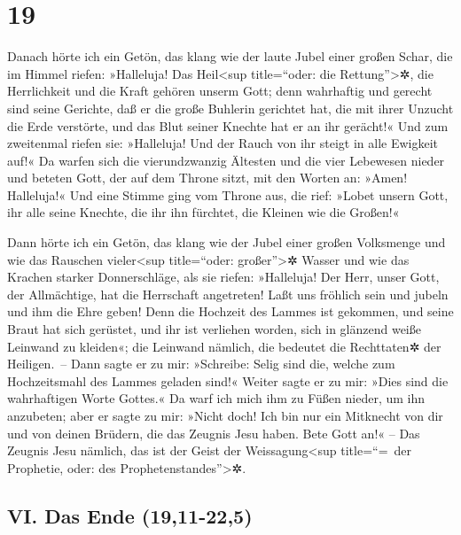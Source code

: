 \hypertarget{section-18}{%
\section{19}\label{section-18}}

 Danach hörte ich ein Getön, das klang wie der laute Jubel
einer großen Schar, die im Himmel riefen: »Halleluja! Das
Heil\textless sup title=``oder: die Rettung''\textgreater✲, die
Herrlichkeit und die Kraft gehören unserm Gott;  denn
wahrhaftig und gerecht sind seine Gerichte, daß er die große Buhlerin
gerichtet hat, die mit ihrer Unzucht die Erde verstörte, und das Blut
seiner Knechte hat er an ihr gerächt!«  Und zum zweitenmal
riefen sie: »Halleluja! Und der Rauch von ihr steigt in alle Ewigkeit
auf!«  Da warfen sich die vierundzwanzig Ältesten und die
vier Lebewesen nieder und beteten Gott, der auf dem Throne sitzt, mit
den Worten an: »Amen! Halleluja!«  Und eine Stimme ging
vom Throne aus, die rief: »Lobet unsern Gott, ihr alle seine Knechte,
die ihr ihn fürchtet, die Kleinen wie die Großen!«

 Dann hörte ich ein Getön, das klang wie der Jubel einer
großen Volksmenge und wie das Rauschen vieler\textless sup title=``oder:
großer''\textgreater✲ Wasser und wie das Krachen starker Donnerschläge,
als sie riefen: »Halleluja! Der Herr, unser Gott, der Allmächtige, hat
die Herrschaft angetreten!  Laßt uns fröhlich sein und
jubeln und ihm die Ehre geben! Denn die Hochzeit des Lammes ist
gekommen, und seine Braut hat sich gerüstet,  und ihr ist
verliehen worden, sich in glänzend weiße Leinwand zu kleiden«; die
Leinwand nämlich, die bedeutet die Rechttaten✲ der Heiligen.~--
 Dann sagte er zu mir: »Schreibe: Selig sind die, welche
zum Hochzeitsmahl des Lammes geladen sind!« Weiter sagte er zu mir:
»Dies sind die wahrhaftigen Worte Gottes.«  Da warf ich
mich ihm zu Füßen nieder, um ihn anzubeten; aber er sagte zu mir: »Nicht
doch! Ich bin nur ein Mitknecht von dir und von deinen Brüdern, die das
Zeugnis Jesu haben. Bete Gott an!« -- Das Zeugnis Jesu nämlich, das ist
der Geist der Weissagung\textless sup title=``=~der Prophetie, oder: des
Prophetenstandes''\textgreater✲.

\hypertarget{vi.-das-ende-1911-225}{%
\subsection{VI. Das Ende (19,11-22,5)}\label{vi.-das-ende-1911-225}}

